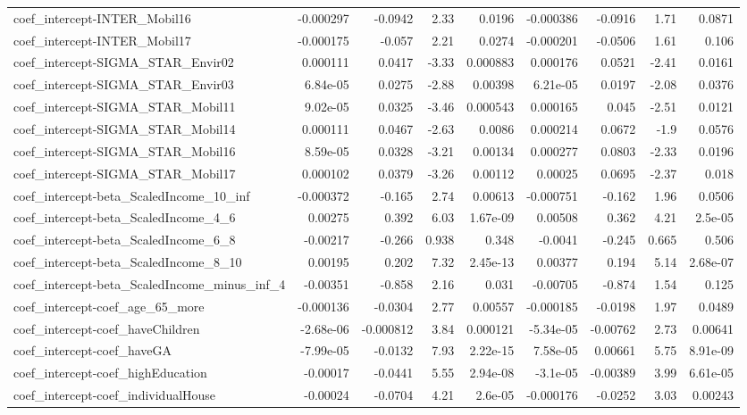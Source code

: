 \begin{tabular}{lrrrrrrrr}
coef_intercept-INTER_Mobil16 & -0.000297 & -0.0942 & 2.33 & 0.0196 & -0.000386 & -0.0916 & 1.71 & 0.0871 \\
coef_intercept-INTER_Mobil17 & -0.000175 & -0.057 & 2.21 & 0.0274 & -0.000201 & -0.0506 & 1.61 & 0.106 \\
coef_intercept-SIGMA_STAR_Envir02 & 0.000111 & 0.0417 & -3.33 & 0.000883 & 0.000176 & 0.0521 & -2.41 & 0.0161 \\
coef_intercept-SIGMA_STAR_Envir03 & 6.84e-05 & 0.0275 & -2.88 & 0.00398 & 6.21e-05 & 0.0197 & -2.08 & 0.0376 \\
coef_intercept-SIGMA_STAR_Mobil11 & 9.02e-05 & 0.0325 & -3.46 & 0.000543 & 0.000165 & 0.045 & -2.51 & 0.0121 \\
coef_intercept-SIGMA_STAR_Mobil14 & 0.000111 & 0.0467 & -2.63 & 0.0086 & 0.000214 & 0.0672 & -1.9 & 0.0576 \\
coef_intercept-SIGMA_STAR_Mobil16 & 8.59e-05 & 0.0328 & -3.21 & 0.00134 & 0.000277 & 0.0803 & -2.33 & 0.0196 \\
coef_intercept-SIGMA_STAR_Mobil17 & 0.000102 & 0.0379 & -3.26 & 0.00112 & 0.00025 & 0.0695 & -2.37 & 0.018 \\
coef_intercept-beta_ScaledIncome_10_inf & -0.000372 & -0.165 & 2.74 & 0.00613 & -0.000751 & -0.162 & 1.96 & 0.0506 \\
coef_intercept-beta_ScaledIncome_4_6 & 0.00275 & 0.392 & 6.03 & 1.67e-09 & 0.00508 & 0.362 & 4.21 & 2.5e-05 \\
coef_intercept-beta_ScaledIncome_6_8 & -0.00217 & -0.266 & 0.938 & 0.348 & -0.0041 & -0.245 & 0.665 & 0.506 \\
coef_intercept-beta_ScaledIncome_8_10 & 0.00195 & 0.202 & 7.32 & 2.45e-13 & 0.00377 & 0.194 & 5.14 & 2.68e-07 \\
coef_intercept-beta_ScaledIncome_minus_inf_4 & -0.00351 & -0.858 & 2.16 & 0.031 & -0.00705 & -0.874 & 1.54 & 0.125 \\
coef_intercept-coef_age_65_more & -0.000136 & -0.0304 & 2.77 & 0.00557 & -0.000185 & -0.0198 & 1.97 & 0.0489 \\
coef_intercept-coef_haveChildren & -2.68e-06 & -0.000812 & 3.84 & 0.000121 & -5.34e-05 & -0.00762 & 2.73 & 0.00641 \\
coef_intercept-coef_haveGA & -7.99e-05 & -0.0132 & 7.93 & 2.22e-15 & 7.58e-05 & 0.00661 & 5.75 & 8.91e-09 \\
coef_intercept-coef_highEducation & -0.00017 & -0.0441 & 5.55 & 2.94e-08 & -3.1e-05 & -0.00389 & 3.99 & 6.61e-05 \\
coef_intercept-coef_individualHouse & -0.00024 & -0.0704 & 4.21 & 2.6e-05 & -0.000176 & -0.0252 & 3.03 & 0.00243 \\

\end{tabular}
